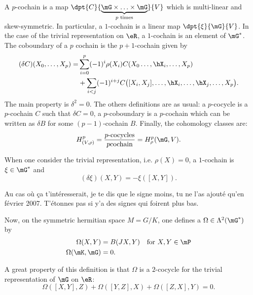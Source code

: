 A $p$-cochain is a map $\dpt{C}{\underbrace{\mG\times\ldots\times\mG}_{p \text{ times}}}{V}$ which is multi-linear and skew-symmetric. In particular, a $1$-cochain is a linear map $\dpt{\xi}{\mG}{V}$. In the case of the trivial representation on $\eR$, a $1$-cochain is an element of $\mG^*$. The coboundary of a $p$ cochain is the $p+1$-cochain given by
\begin{equation}
\begin{split}
(\delta C)(X_0,\ldots,X_p)=&\sum_{i=0}^{p}(-1)^i\rho(X_i)C(X_0\ldots,\hX_i,\ldots,X_p)\\
                           &+\sum_{i<j}(-1)^{i+j}C\big(  [X_i,X_j],\ldots,\hX_i,\ldots,\hX_j,\ldots,X_p \big).
\end{split}
\end{equation}
The main property is $\delta^2=0$. The others definitions are as usual: a $p$-cocycle is a $p$-cochain $C$ such that $\delta C=0$, a $p$-coboundary is a $p$-cochain which can be written as $\delta B$ for some  $(p-1)$-cochain $B$. Finally, the cohomology classes are:
\begin{equation}
    H^{p}_{(V,\rho)}=\frac{p\text{-cocycles}}{p\text{cochain}}=H^p_{\rho}(\mG,V).
\end{equation}

When one consider the trivial representation, i.e. $\rho(X)=0$, a $1$-cochain is $\xi\in\mG^*$ and
\begin{equation}  \label{EqDefcochaintrivC}
(\delta\xi)(X,Y)=-\xi([X,Y]).
\end{equation}

\begin{probleme}
Au cas où ça t'intéresserait, je te dis que le signe moins, tu ne l'as ajouté qu'en février 2007. T'étonnes pas si y'a des signes qui foirent plus bas.
\end{probleme}

Now, on the symmetric hermitian space $M=G/K$, one defines a $\Omega\in\Lambda^2(\mG^*)$ by
\begin{subequations}
\begin{align}
   \Omega(X,Y)&=B(JX,Y)&\text{for }X,Y\in\mP  \label{eq:def_Omega_1}    \\
   \Omega(\mK,\mG)&=0.                          \label{eq:def_Omega_2}
\end{align}
\end{subequations}

A great property of this definition is that $\Omega$ is a $2$-cocycle for the trivial representation of $\mG$ on $\eR$:
\[
\Omega([X,Y],Z)+\Omega([Y,Z],X)+\Omega([Z,X],Y)=0.
\]

